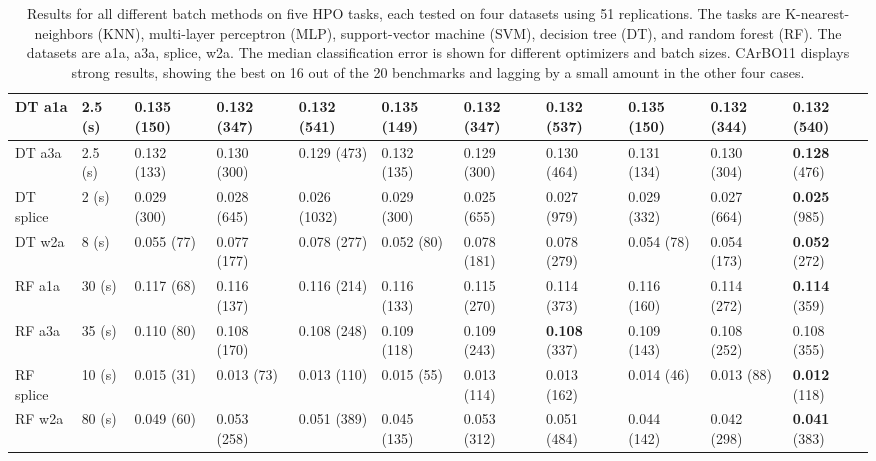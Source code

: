 \documentclass{article}
\begin{document}
\begin{table}[ht]
\begin{tabular}{ | l  l  l l l l l l l l l | }
DT a1a 		& 2.5 (s) &     0.135 (150) & 0.132 (347) & \textbf{0.132} (541) & 0.135 (149) & 0.132 (347) & 0.132 (537) & 0.135 (150) & 0.132 (344) & 0.132 (540) \\\hline
DT a3a 		& 2.5 (s) &     0.132 (133) & 0.130 (300) & 0.129 (473) & 0.132 (135) & 0.129 (300) & 0.130 (464) & 0.131 (134) & 0.130 (304) & \textbf{0.128} (476) \\\hline
DT splice 	& 2 (s)   &  0.029 (300) & 0.028 (645) & 0.026 (1032) & 0.029 (300) & 0.025 (655) & 0.027 (979) & 0.029 (332) & 0.027 (664) &\textbf{ 0.025} (985) \\\hline
DT w2a 		& 8 (s)   &     0.055 (77) & 0.077 (177) & 0.078 (277) & 0.052 (80) & 0.078 (181) & 0.078 (279) & 0.054 (78) & 0.054 (173) & \textbf{0.052} (272) \\\hline
RF a1a 		& 30 (s)  &     0.117 (68) & 0.116 (137) & 0.116 (214) & 0.116 (133) & 0.115 (270) & 0.114 (373) & 0.116 (160) & 0.114 (272) & \textbf{0.114} (359) \\\hline
RF a3a 		& 35 (s)  &     0.110 (80) & 0.108 (170) & 0.108 (248) & 0.109 (118) & 0.109 (243) & \textbf{0.108} (337) & 0.109 (143) & 0.108 (252) & 0.108 (355) \\\hline
RF splice 	& 10 (s)  &  0.015 (31) & 0.013 (73) & 0.013 (110) & 0.015 (55) & 0.013 (114) & 0.013 (162) & 0.014 (46) & 0.013 (88) & \textbf{0.012} (118) \\\hline
RF w2a 		& 80 (s)  &     0.049 (60) & 0.053 (258) & 0.051 (389) & 0.045 (135) & 0.053 (312) & 0.051 (484) & 0.044 (142) & 0.042 (298) & \textbf{0.041} (383) \\\hline
\end{tabular}
\caption{Results for all different batch methods on five HPO tasks, each tested on four datasets using 51 replications. The tasks are K-nearest-neighbors (KNN), multi-layer perceptron (MLP), support-vector machine (SVM), decision tree (DT), and random forest (RF). The datasets are a1a, a3a, splice, w2a. The median classification error is shown for different optimizers and batch sizes. CArBO11 displays strong results, showing the best on 16 out of the 20 benchmarks and lagging by a small amount in the other four cases. } \label{tab:batch_results}
\end{table}
\end{document}
